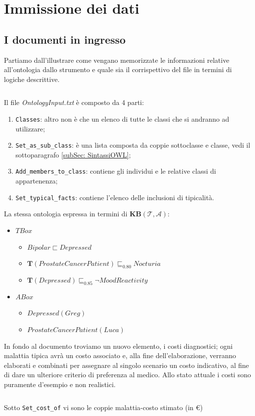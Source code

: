 \section{Immissione dei dati}
\subsection{I documenti in ingresso}
Partiamo dall'illustrare come vengano memorizzate le informazioni relative all'ontologia dallo strumento 
e quale sia il corrispettivo del file in termini di logiche descrittive. 
\inputminted[lastline=11]{text}{codice/ExOntoInput.txt}
Il file \emph{OntologyInput.txt} è composto da 4 parti:
\begin{enumerate}
	\item \texttt{Classes}: altro non è che un elenco di tutte le classi che si andranno ad utilizzare;
	\item \texttt{Set_as_sub_class}: è una lista composta da coppie sottoclasse e classe, vedi il sottoparagrafo \ref{subSec: SintassiOWL};
	\item \texttt{Add_members_to_class}: contiene gli individui e le relative classi di appartenenza; 
	\item \texttt{Set_typical_facts}: contiene l'elenco delle inclusioni di tipicalità.
\end{enumerate}

La stessa ontologia espressa in termini di \textbf{KB}$ (\mathcal{T}, \mathcal{A}) $:
\begin{itemize}
	\item $TBox$ 
		\begin{itemize}
			\item $ Bipolar \sqsubset Depressed $
			\item $ \mathbf T(ProstateCancerPatient) \sqsubseteq_{0.80} Nocturia $
			\item $ \mathbf T(Depressed) \sqsubseteq_{0.85} \neg MoodReactivity $
		\end{itemize}
	\item $ABox$ 
		\begin{itemize}
			\item $ Depressed(Greg) $
			\item $ ProstateCancerPatient(Luca) $
		\end{itemize}
\end{itemize}

In fondo al documento troviamo un nuovo elemento, i costi diagnostici; ogni malattia tipica avrà
un costo associato e, alla fine dell'elaborazione, verranno elaborati e combinati per assegnare al singolo
scenario un costo indicativo, al fine di dare un ulteriore criterio di preferenza al medico. Allo stato attuale i costi sono puramente d'esempio e non realistici.
\inputminted[firstline=13]{text}{codice/ExOntoInput.txt}
Sotto \texttt{Set_cost_of} vi sono le coppie malattia-costo stimato (in €)

